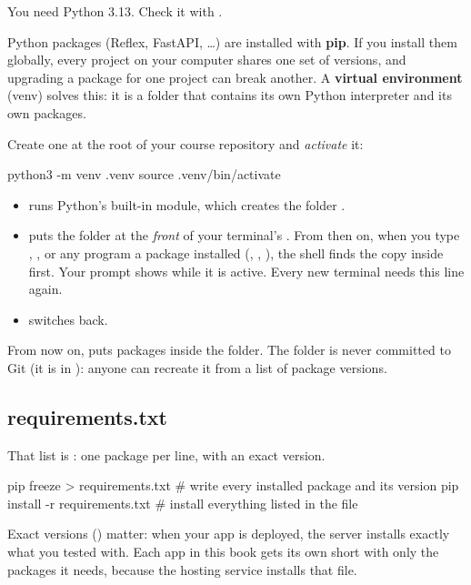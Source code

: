 You need Python 3.13. Check it with .

Python packages (Reflex, FastAPI, \ldots) are installed with \textbf{pip}. If you install them globally, every project on your computer shares one set of versions, and upgrading a package for one project can break another. A \textbf{virtual environment} (venv) solves this: it is a folder that contains its own Python interpreter and its own packages.

Create one at the root of your course repository and \emph{activate} it:

\begin{code}
python3 -m venv .venv
source .venv/bin/activate
\end{code}

\begin{itemize}
\item {} runs Python's built-in  module, which creates the folder .
\item {} puts the folder  at the \emph{front} of your terminal's . From then on, when you type , , or any program a package installed (, , ), the shell finds the copy inside  first. Your prompt shows  while it is active. Every new terminal needs this line again.
\item {} switches back.
\end{itemize}

From now on,  puts packages inside the  folder. The folder is never committed to Git (it is in ): anyone can recreate it from a list of package versions.

\subsection{requirements.txt}

That list is : one package per line, with an exact version.

\begin{code}
pip freeze > requirements.txt      # write every installed package and its version
pip install -r requirements.txt    # install everything listed in the file
\end{code}

Exact versions () matter: when your app is deployed, the server installs exactly what you tested with. Each app in this book gets its own short  with only the packages it needs, because the hosting service installs that file.

